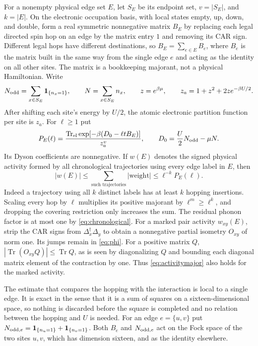 \documentclass[11pt]{article}
\DeclareMathOperator{\Tr}{Tr}
\newcommand{\Deltaop}{\Delta}
\begin{document}
For a nonempty physical edge set $E$, let $S_E$ be its endpoint set, $v=|S_E|$, and $k=|E|$. On the electronic occupation basis, with local states empty, up, down, and double, form a real symmetric nonnegative matrix $B_E$ by replacing each legal directed spin hop on an edge by the matrix entry $1$ and removing its CAR sign. Different legal hops have different destinations, so $B_E=\sum_{e\in E}B_e$, where $B_e$ is the matrix built in the same way from the single edge $e$ and acting as the identity on all other sites. The matrix is a bookkeeping majorant, not a physical Hamiltonian. Write
\[
 N_{\rm odd}=\sum_{x\in S_E}{\bf1}_{\{n_x=1\}},\qquad
 N=\sum_{x\in S_E}n_x,\qquad z=e^{\beta\mu},\qquad
 z_a=1+z^2+2ze^{-\beta U/2}.
\]
After shifting each site's energy by $U/2$, the atomic electronic partition function per site is $z_a$. For $\ell\ge1$ put
\begin{equation}\label{eq:PE}
 P_E(\ell)=\frac{\Tr_{\rm el}\exp[-\beta(D_0-\ell tB_E)]}{z_a^v},
 \qquad D_0=\frac U2N_{\rm odd}-\mu N.
\end{equation}
Its Dyson coefficients are nonnegative. If $w(E)$ denotes the signed physical activity formed by all chronological trajectories using every edge label in $E$, then
\begin{equation}\label{eq:activitymajor}
 |w(E)|\le \sum_{\text{such trajectories}}|\text{weight}|
 \le \ell^{-k}P_E(\ell).
\end{equation}
Indeed a trajectory using all $k$ distinct labels has at least $k$ hopping insertions. Scaling every hop by $\ell$ multiplies its positive majorant by $\ell^m\ge\ell^k$, and dropping the covering restriction only increases the sum. The residual phonon factor is at most one by \eqref{eq:chronological}. For a marked pair activity $w_{xy}(E)$, strip the CAR signs from $\Deltaop_x^\dagger\Deltaop_y$ to obtain a nonnegative partial isometry $O_{xy}$ of norm one. Its jumps remain in \eqref{eq:phi}. For a positive matrix $Q$, $|\Tr(O_{xy}Q)|\le\Tr Q$, as is seen by diagonalizing $Q$ and bounding each diagonal matrix element of the contraction by one. Thus \eqref{eq:activitymajor} also holds for the marked activity.

The estimate that compares the hopping with the interaction is local to a single edge. It is exact in the sense that it is a sum of squares on a sixteen-dimensional space, so nothing is discarded before the square is completed and no relation between the hopping and $U$ is needed. For an edge $e=\{u,v\}$ put $N_{{\rm odd},e}=\mathbf 1_{\{n_u=1\}}+\mathbf 1_{\{n_v=1\}}$. Both $B_e$ and $N_{{\rm odd},e}$ act on the Fock space of the two sites $u,v$, which has dimension sixteen, and as the identity elsewhere.
\end{document}
